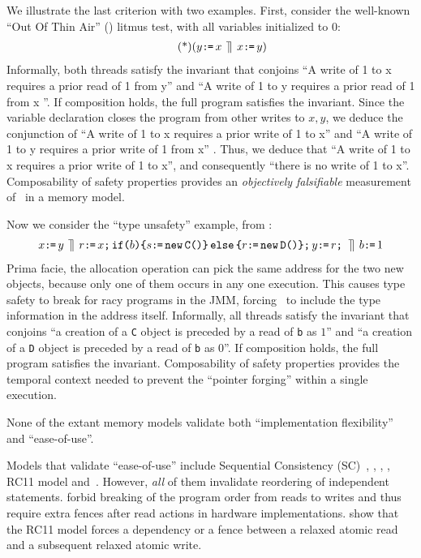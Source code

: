 We illustrate the last criterion with two examples.   
First, consider the well-known ``Out Of Thin Air'' (\oota) litmus test, with all variables initialized to $0$:
\begin{align*}
  \tag{*}\label{oota1}
  (y\texttt{:}\mkern-1mu\texttt{=}\, x \,\mathbin{\rrceil}\, x \texttt{:}\mkern-1mu\texttt{=}\, y)
\end{align*}
Informally, both threads satisfy the invariant that conjoins ``A write of 1  to x  requires a prior read  of 1 from y'' and ``A write of 1  to y  requires a prior read  of 1 from x ''.  If composition holds, the full program satisfies the invariant.  Since the variable declaration closes the program from other writes to $x,y$, we  deduce the conjunction of  ``A write of 1  to x  requires a prior write  of 1 to x'' and ``A write of 1  to y  requires a prior write  of 1 from x'' . Thus, we deduce that ``A write of 1  to x  requires a prior write  of 1 to x'', and consequently ``there is no write of 1 to x''. 
Composability  of safety properties provides an  {\em objectively  falsifiable} measurement of \oota\ in a memory model. 


Now we consider the ``type unsafety'' example, from
\citep[Figure 8]{DBLP:journals/toplas/Lochbihler13}:
\begin{align*}
  x\texttt{:}\mkern-1mu\texttt{=}\, y
  \,\mathbin{\rrceil}\,
  r\texttt{:}\mkern-1mu\texttt{=}\, x \texttt{;}\, \texttt{if}\allowbreak\texttt{(}b\texttt{)} \allowbreak\texttt{\{} s \texttt{:}\mkern-1mu\texttt{=}\, \texttt{new}\, \texttt{C()} \texttt{\}}\,\allowbreak\texttt{else}\allowbreak\,\texttt{\{} r \texttt{:}\mkern-1mu\texttt{=}\, \texttt{new}\, \texttt{D()} \texttt{\}}  \texttt{;}\, y \texttt{:}\mkern-1mu\texttt{=}\, r \texttt{;}\,  
  \,\mathbin{\rrceil}\,
  b \texttt{:}\mkern-1mu\texttt{=}\, 1   
\end{align*}
Prima facie, the allocation operation can pick the same address for the two new objects, because only one of them occurs in any one execution.   This causes type safety to break for racy programs in the JMM, forcing~\citeauthor{DBLP:journals/toplas/Lochbihler13} to include the type information in the address itself.
%
Informally, all threads satisfy the invariant that conjoins ``a creation of a \texttt{C} object is preceded by a read of \texttt{b} as $1$'' and ``a creation of a \texttt{D} object is preceded by a read of \texttt{b} as $0$''.  If composition holds, the full program satisfies the invariant.   
%
Composability of safety properties provides the temporal context needed to prevent the ``pointer forging''  within a single execution.  


None of the extant memory models validate both ``implementation flexibility'' and ``ease-of-use''.  

Models that validate ``ease-of-use'' include Sequential Consistency (SC)~\citet{Lamport:1979:MMC:1311099.1311750}, \citet{Dolan:2018:BDR:3192366.3192421}, \citet{DBLP:conf/pldi/LahavVKHD17}, \citet{DBLP:conf/lics/JeffreyR16}, RC11 model\cite{DBLP:conf/pldi/LahavVKHD17} and~\citet{BoehmOOTA}.  However, {\em all} of them invalidate reordering of independent statements.  \cite{Dolan:2018:BDR:3192366.3192421,BoehmOOTA,DBLP:conf/lics/JeffreyR16} forbid breaking of the program order from reads to writes and thus require extra fences after read actions in hardware implementations.  \citet{Boehm:2014:OGA:2618128.2618134} show that the RC11 model\cite{DBLP:conf/pldi/LahavVKHD17} forces a dependency or a fence between a relaxed atomic
read and a subsequent relaxed atomic write.  


